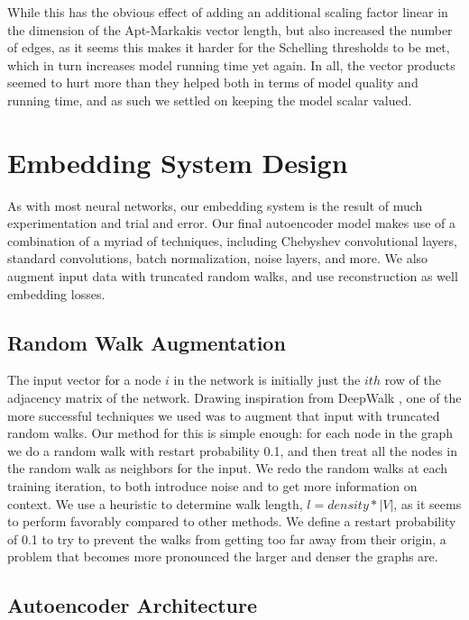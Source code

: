 \documentclass[12pt,twoside]{report}
\begin{document}
While this has the obvious effect of adding an additional scaling factor linear in the dimension of the Apt-Markakis vector length, but also increased the number of edges, as it seems this makes it harder for the Schelling thresholds to be met, which in turn increases model running time yet again. In all, the vector products seemed to hurt more than they helped both in terms of model quality and running time, and as such we settled on keeping the model scalar valued. \\

\section{Embedding System Design}

As with most neural networks, our embedding system is the result of much experimentation and trial and error. Our final autoencoder model makes use of a combination of a myriad of techniques, including Chebyshev convolutional layers, standard convolutions, batch normalization, noise layers, and more. We also augment input data with truncated random walks, and use reconstruction as well embedding losses. \\

\subsection{Random Walk Augmentation}

The input vector for a node $i$ in the network is initially just the $ith$ row of the adjacency matrix of the network. Drawing inspiration from DeepWalk \cite{perozzi2014deepwalk}, one of the more successful techniques we used was to augment that input with truncated random walks. Our method for this is simple enough: for each node in the graph we do a random walk with restart probability 0.1, and then treat all the nodes in the random walk as neighbors for the input. We redo the random walks at each training iteration, to both introduce noise and to get more information on context. We use a heuristic to determine walk length, $l = density * |V|$, as it seems to perform favorably compared to other methods. We define a restart probability of 0.1 to try to prevent the walks from getting too far away from their origin, a problem that becomes more pronounced the larger and denser the graphs are. \\

\subsection{Autoencoder Architecture}
\end{document}
